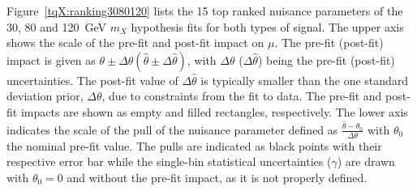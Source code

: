 Figure~\ref{tqX:ranking3080120} lists the 15 top ranked nuisance parameters of the 30, 80 and 120~GeV $m_X$ hypothesis fits for both types of signal. The upper axis shows the scale of the pre-fit and post-fit impact on $\mu$. The pre-fit (post-fit) impact is given as $\theta \pm \Delta\theta (\hat{\theta} \pm \Delta\hat{\theta})$, with $\Delta\theta$ ($\Delta\hat{\theta}$) being the pre-fit (post-fit) uncertainties. The post-fit value of $\Delta\hat{\theta}$ is typically smaller than the one standard deviation prior, $\Delta\theta$, due to constraints from the fit to data. The pre-fit and post-fit impacts are shown as empty and filled rectangles, respectively. The lower axis indicates the scale of the pull of the nuisance parameter defined as $\frac{\hat{\theta} -\theta_0}{\Delta\theta}$ with $\theta_0$ the nominal pre-fit value. The pulls are indicated as black points with their respective error bar while the single-bin statistical uncertainties ($\gamma$) are drawn with $\theta_0=0$ and without the pre-fit impact, as it is not properly defined.\\

